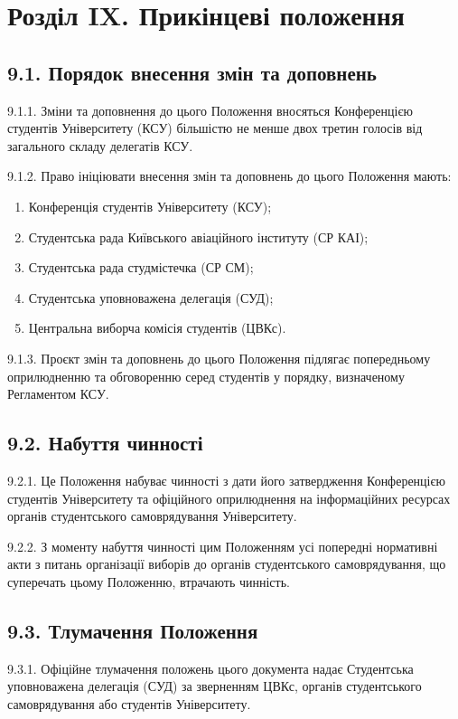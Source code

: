 \section*{Розділ IX. Прикінцеві положення}

\subsection*{9.1. Порядок внесення змін та доповнень}
    9.1.1. Зміни та доповнення до цього Положення вносяться Конференцією студентів Університету (КСУ) більшістю не менше двох третин голосів від загального складу делегатів КСУ.

    9.1.2. Право ініціювати внесення змін та доповнень до цього Положення мають:

        \begin{enumerate}[label=\alph*)]
            \item Конференція студентів Університету (КСУ);
            \item Студентська рада Київського авіаційного інституту (СР КАІ);
            \item Студентська рада студмістечка (СР СМ);
            \item Студентська уповноважена делегація (СУД);
            \item Центральна виборча комісія студентів (ЦВКс).
        \end{enumerate}

    9.1.3. Проєкт змін та доповнень до цього Положення підлягає попередньому оприлюдненню та обговоренню серед студентів у порядку, визначеному Регламентом КСУ.

\subsection*{9.2. Набуття чинності}
    9.2.1. Це Положення набуває чинності з дати його затвердження Конференцією студентів Університету та офіційного оприлюднення на інформаційних ресурсах органів студентського самоврядування Університету.

    9.2.2. З моменту набуття чинності цим Положенням усі попередні нормативні акти з питань організації виборів до органів студентського самоврядування, що суперечать цьому Положенню, втрачають чинність.

\subsection*{9.3. Тлумачення Положення}
    9.3.1. Офіційне тлумачення положень цього документа надає Студентська уповноважена делегація (СУД) за зверненням ЦВКс, органів студентського самоврядування або студентів Університету.

